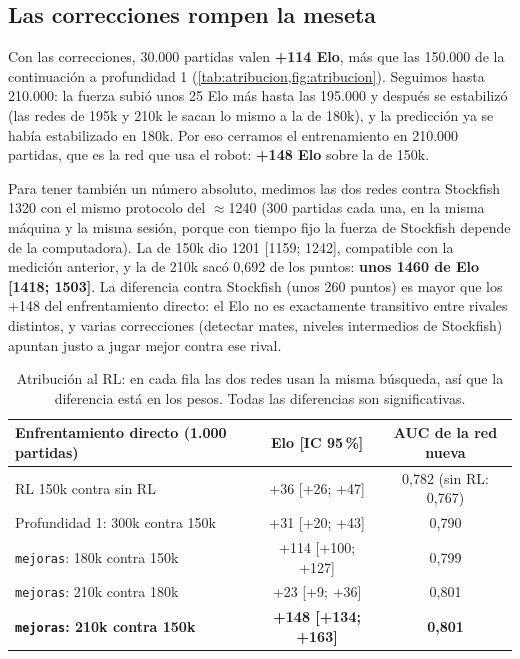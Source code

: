 \documentclass[11pt,a4paper]{article}
\begin{document}
\subsection{Las correcciones rompen la meseta}

Con las correcciones, 30.000 partidas valen \textbf{+114 Elo}, más que las
150.000 de la continuación a profundidad 1 (\cref{tab:atribucion,fig:atribucion}).
Seguimos hasta 210.000: la fuerza subió unos 25 Elo más hasta las 195.000 y
después se estabilizó (las redes de 195k y 210k le sacan lo mismo a la de
180k), y la predicción ya se había estabilizado en 180k. Por eso cerramos el
entrenamiento en 210.000 partidas, que es la red que usa el robot:
\textbf{+148 Elo} sobre la de 150k.

Para tener también un número absoluto, medimos las dos redes contra
Stockfish 1320 con el mismo protocolo del $\approx$1240 (300 partidas cada
una, en la misma máquina y la misma sesión, porque con tiempo fijo la
fuerza de Stockfish depende de la computadora). La de 150k dio
1201 [1159; 1242], compatible con la medición anterior, y la de 210k sacó
0,692 de los puntos: \textbf{unos 1460 de Elo [1418; 1503]}. La diferencia
contra Stockfish (unos 260 puntos) es mayor que los +148 del
enfrentamiento directo: el Elo no es exactamente transitivo entre rivales
distintos, y varias correcciones (detectar mates, niveles intermedios de
Stockfish) apuntan justo a jugar mejor contra ese rival.

\begin{table}[H]
\centering\small
\begin{tabular}{@{}lcc@{}}
\toprule
Enfrentamiento directo (1.000 partidas) & Elo [IC 95\,\%] & AUC de la red nueva \\
\midrule
RL 150k contra sin RL & +36 [+26; +47] & 0,782 (sin RL: 0,767) \\
Profundidad 1: 300k contra 150k & +31 [+20; +43] & 0,790 \\
\texttt{mejoras}: 180k contra 150k & +114 [+100; +127] & 0,799 \\
\texttt{mejoras}: 210k contra 180k & +23 [+9; +36] & 0,801 \\
\textbf{\texttt{mejoras}: 210k contra 150k} & \textbf{+148 [+134; +163]} & \textbf{0,801} \\
\bottomrule
\end{tabular}
\caption{Atribución al RL: en cada fila las dos redes usan la misma
búsqueda, así que la diferencia está en los pesos. Todas las diferencias
son significativas.}
\label{tab:atribucion}
\end{table}
\end{document}
